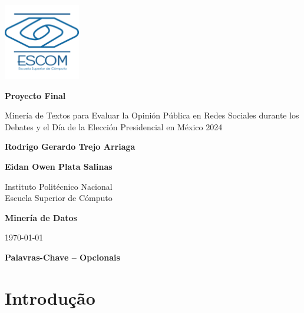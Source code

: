 \documentclass[10pt, a4paper]{article}
\title{\mytitle}
\author{\myauthor\hspace{1em}\\\contact\\Instituto Politécnico Nacional -- ESCOM\hspace{0.5em}\\\hspace{0.5em}\mymodule}
\date{}
\begin{document}
	\begin{titlepage}
		\centering
		\includegraphics[width=0.25\textwidth]{images/logo.png}\par\vspace{2.5cm} %
		{\huge \textbf{Proyecto Final}}\par\vspace{2cm}
		{\LARGE Minería de Textos para Evaluar la Opinión Pública en Redes Sociales durante los Debates y el Día de la Elección Presidencial en México 2024}\par\vspace{2cm}
		{\large \textbf{Rodrigo Gerardo Trejo Arriaga}}\par\vspace{0.2cm}
		{\large \textbf{Eidan Owen Plata Salinas}}\par\vspace{0.5cm}
		{\large Instituto Politécnico Nacional\\ Escuela Superior de Cómputo}\par\vspace{1cm}
		{\large \textbf{Minería de Datos}}\par\vspace{2cm}
		{\large \today}\par
	\end{titlepage}
	
	\newpage
	\tableofcontents
	\newpage
	
	
	\newpage
	\maketitle
	\thispagestyle{fancy}
	\begin{abstract}
        Duas ou três sentenças que sumarizem o experimento. Não há necessidade de se aprofundar. 
	\end{abstract}
    
	\textbf{Palavras-Chave -- Opcionais}{\mykeywords}

	\section{Introdução}
\end{document}
